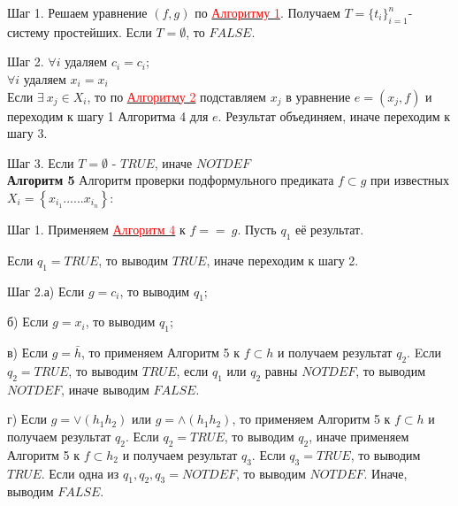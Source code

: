 \documentclass[12pt]{article}
\begin{document}
\begin{comment}     
     Шаг 0. Если $Len(f) \neq Len(g)$, то $FALSE$, иначе переходим к шагу 1.
\end{comment}     
     Шаг 1. Решаем уравнение $(f,g)$ по \hyperlink{a1}{ \textcolor{red} {Алгоритму 1}}.  Получаем  $T = \lbrace  t_{i}  \rbrace_{i=1}^{n} $- систему простейших. Если  $ T= {\emptyset}$, то $FALSE$.
     
     Шаг 2. $\forall i$ удаляем $c_{i} = c_{i}$; 
     \\
      $\forall i$ удаляем $x_{i} = x_{i}$
     \\ 
     Если $\exists \: x_{j} \in X_{i}$, то по \hyperlink{a2}{ \textcolor{red}{Алгоритму 2}} подставляем $x_{j}$  в уравнение $e = (x_{j}, f)$ и переходим к шагу 1 Алгоритма 4 для $e$. Результат объединяем, иначе переходим к шагу 3.
     
     Шаг 3. Если $ T= {\emptyset}$ - $TRUE$, иначе $NOTDEF$
     \\
     
      \hypertarget{a5}{{\bf Алгоритм 5}} Алгоритм проверки подформульного предиката $f \subset g $ при известных $ X_{i} = \left\lbrace x_{i_{1}} ......x_{i_{n}}\right\rbrace $:
\begin{comment}
     Шаг 0. Если $Len(f) > Len(g)$, то $FALSE$, иначе переходим к шагу 1.
\end{comment}     
     Шаг 1. Применяем \hyperlink{a3}{ \textcolor{red}{Алгоритм 4}}  к $f == \:g$. Пусть $q_{1}$ её результат.
\begin{comment}
      Если $q_{1} = NOTDEF$, то выводим $q_{1}$
\end{comment}
     
      Если $q_{1} = TRUE$, то выводим $TRUE$, иначе переходим к шагу 2.
     
     Шаг 2.а) Если $ g = c_{i}$, то выводим $q_{1}$;
     
      б) Если $ g = x_{i}$, то выводим $q_{1}$;
      
    в) Если $ g = \bar h$, то применяем  Алгоритм 5 к  $f\subset h$ и получаем результат $q_{2}$. Eсли $q_{2} = TRUE$, то выводим $TRUE$, если $q_{1}$ или $q_{2}$ равны $NOTDEF$, то выводим $NOTDEF$, иначе выводим $FALSE$.
    
    г) Если $ g = \vee (h_{1} h_{2})$ или  $ g = \wedge (h_{1} h_{2})$, то применяем  Алгоритм 5 к  $f\subset h$   и получаем результат $q_{2}$. Если $q_{2} = TRUE$, то выводим $q_{2}$, иначе применяем Алгоритм 5 к $f\subset h_{2}$ и  получаем результат  $q_{3}$. Если $q_{3} = TRUE$, то выводим $TRUE$. Если одна из $q_{1}, q_{2}, q_{3} = NOTDEF$, то выводим $NOTDEF$. Иначе, выводим $FALSE$.

 
     
     
     
     
     
     
\end{document}
